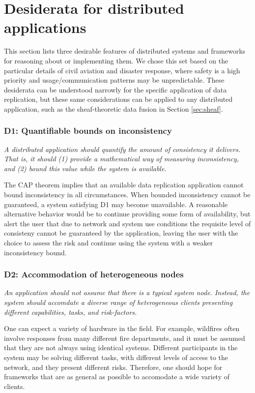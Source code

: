 \section{Desiderata for distributed applications}
\label{sec:des}

This section lists three desirable features of distributed systems and
frameworks for reasoning about or implementing them. We chose this set
based on the particular details of civil aviation and disaster
response, where safety is a high priority and usage/communication
patterns may be unpredictable. These desiderata can be understood
narrowly for the specific application of data replication, but these
same considerations can be applied to any distributed application,
such as the sheaf-theoretic data fusion in Section \ref{sec:sheaf}.

\subsubsection*{D1: Quantifiable bounds on inconsistency}

\emph{A distributed application should quantify the amount of consistency
it delivers. That is, it should (1) provide a mathematical way of
measuring inconsistency, and (2) bound this value while the system is
available.}

The CAP theorem implies that an available data replication application
cannot bound inconsistency in all circumstances. When bounded
inconsistency cannot be guaranteed, a system satisfying D1 may become
unavailable. A reasonable alternative behavior would be to continue
providing some form of availability, but alert the user that due to
network and system use conditions the requisite level of consisteny
cannot be guaranteed by the application, leaving the user with the
choice to assess the risk and continue using the system with a weaker
inconsistency bound.

\subsubsection*{D2: Accommodation of heterogeneous nodes}

\emph{An application should not assume that there is a typical system
node. Instead, the system should accomdate a diverse range of
heterogeneous clients presenting different capabilities, tasks, and
risk-factors.}

One can expect a variety of hardware in the field. For example,
wildfires often involve responses from many different fire
departments, and it must be assumed that they are not always using
identical systems. Different participants in the system may be solving
different tasks, with different levels of access to the network, and
they present different risks. Therefore, one should hope for
frameworks that are as general as possible to accomodate a wide
variety of clients.

